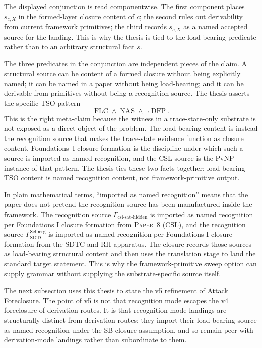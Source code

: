 \documentclass[11pt]{article}
\newcommand{\PaperCSL}{\textsc{Paper~8 (CSL)}}
\theoremstyle{definition}
\begin{document}
The displayed conjunction is read componentwise.  The first component
places \(s_{c,X}\) in the formed-layer closure content of \(c\); the
second rules out derivability from current framework primitives; the
third records \(s_{c,X}\) as a named accepted source for the landing.
This is why the thesis is tied to the load-bearing predicate rather
than to an arbitrary structural fact \(s\).

The three predicates in the conjunction are independent pieces of the
claim.  A structural source can be content of a formed closure without
being explicitly named; it can be named in a paper without being
load-bearing; and it can be derivable from primitives without being a
recognition source.  The thesis asserts the specific TSO pattern
\[
  \operatorname{FLC}\wedge\operatorname{NAS}\wedge\neg\operatorname{DFP}.
  \]
This is the right meta-claim because the witness in a trace-state-only
substrate is not exposed as a direct object of the problem.  The
load-bearing content is instead the recognition source that makes the
trace-state evidence function as closure content.  Foundations~I
closure formation \cite{Tsiokos2026EmergenceCalculus} is the discipline
under which such a source is imported as named recognition, and the CSL
source \cite{Tsiokos2026CSL} is the PvNP instance of that pattern.  The
thesis ties these two facts together: load-bearing TSO content is named
recognition content, not framework-primitive output.

In plain mathematical terms, ``imported as named recognition'' means that
the paper does not pretend the recognition source has been manufactured
inside the framework. The recognition source
\(\Gamma_{\text{csl-sat-hidden}}\) is imported as named recognition per
Foundations I closure formation from \PaperCSL, and the recognition source
\(\Gamma_{\text{SDTC}}^{\text{Selberg}}\) is imported as named recognition
per Foundations I closure formation from the SDTC and RH apparatus. The
closure records those sources as load-bearing structural content and then
uses the translation stage to land the standard target statement. This is
why the framework-primitive sweep option can supply grammar without
supplying the substrate-specific source itself.

The next subsection uses this thesis to state the v5 refinement of Attack
Foreclosure. The point of v5 is not that recognition mode escapes the v4
foreclosure of derivation routes. It is that recognition-mode landings are
structurally distinct from derivation routes: they import their
load-bearing source as named recognition under the SB closure assumption,
and so remain peer with derivation-mode landings rather than subordinate
to them.
\end{document}
